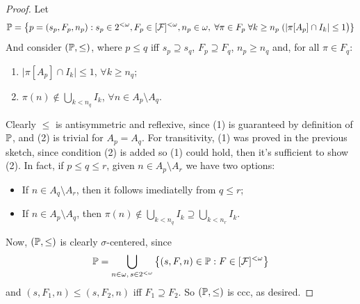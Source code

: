 \begin{proof}
    Let
    $$\mathbb{P}=\left\{p=(s_p,F_p,n_p):s_p\in2^{<\omega},F_p\in[\mathcal{F}]^{<\omega},n_p\in\omega,\;\forall\pi\in F_p\;\forall k\geq n_p\;(\lvert\pi[A_p]\cap I_k\rvert\leq 1\right)\}$$
    And consider $(\mathbb{P},\leq)$, where $p\leq q$ iff $s_p\supseteq s_q$, $F_p\supseteq F_q$, $n_p\geq n_q$ and, for all $\pi\in F_q$:
    \begin{enumerate}
        \item $\lvert\pi[A_p]\cap I_k\rvert\leq 1$, $\forall k\geq n_q$;
        \item $\pi(n)\notin\bigcup_{k<n_q}I_k$, $\forall n\in A_p\setminus A_q$.
    \end{enumerate}
    Clearly $\leq$ is antisymmetric and reflexive, since (1) is guaranteed by definition of $\mathbb{P}$, and (2) is trivial for $A_p=A_q$. For transitivity, (1) was proved in the previous sketch, since condition (2) is added so (1) could hold, then it's sufficient to show (2). In fact, if $p\leq q\leq r$, given $n\in A_p\setminus A_r$ we have two options:
    \begin{itemize}
        \item If $n\in A_q\setminus A_r$, then it follows imediatelly from $q\leq r$;
        \item If $n\in A_p\setminus A_q$, then $\pi(n)\notin\bigcup_{k<n_q}I_k\supseteq\bigcup_{k<n_r}I_k$.
    \end{itemize}

    Now, $(\mathbb{P},\leq)$ is clearly $\sigma$-centered, since
    $$\mathbb{P}=\bigcup_{n\in\omega,\,s\in2^{<\omega}}\left\{(s,F,n)\in\mathbb{P}:F\in[\mathcal{F}]^{<\omega}\right\}$$
    and $(s,F_1,n)\leq(s,F_2,n)$ iff $F_1\supseteq F_2$. So $(\mathbb{P},\leq)$ is ccc, as desired.


\end{proof}
